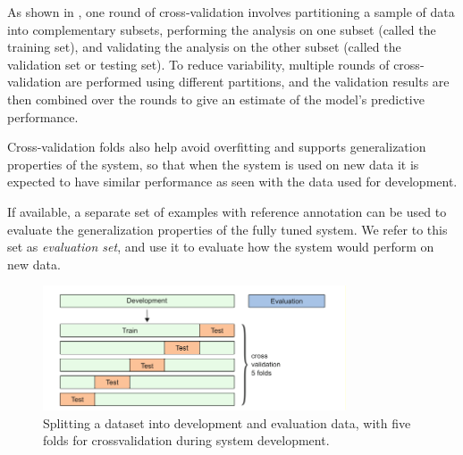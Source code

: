 As shown in , one round of cross-validation involves partitioning a sample of data into complementary subsets, performing the analysis on one subset (called the training set), and validating the analysis on the other subset (called the validation set or testing set). To reduce variability, multiple rounds of cross-validation are performed using different partitions, and the validation results are then combined over the rounds to give an estimate of the model’s predictive performance. 


Cross-validation folds also help avoid overfitting and supports generalization properties of the system, so that when the
system is used on new data it is expected to have similar performance as seen with the data used for development.

If available, a separate set of examples with reference annotation can be used to evaluate the generalization properties of the fully tuned system. We refer to this set as \textit{evaluation set}, and use it to evaluate how the system would perform on new data.

\begin{figure}[h]
	\centering
	\includegraphics[width=0.8\textwidth]{img/cross-valid}
	\caption[Cross-Validation Splitting]{Splitting a dataset into development and evaluation data, with five folds for crossvalidation during system development.}
	\label{fig:cross-valid}
\end{figure}

\newpage
